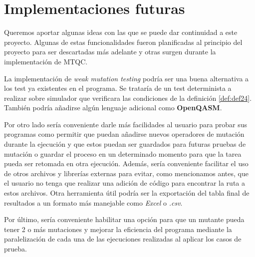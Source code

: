 \section{Implementaciones futuras}

Queremos aportar algunas ideas con las que se puede dar continuidad a este proyecto. Algunas de estas funcionalidades fueron planificadas al principio del proyecto para ser descartadas más adelante y otras surgen durante la implementación de MTQC.

La implementación de \textit{weak mutation testing} podría ser una buena alternativa a los test ya existentes en el programa. Se trataría de un test determinista a realizar sobre simulador que verificara las condiciones de la definición \ref{def:def24}. También podría añadirse algún lenguaje adicional como \textbf{OpenQASM}.

Por otro lado sería conveniente darle más facilidades al usuario para probar sus programas como permitir que puedan añadirse nuevos operadores de mutación durante la ejecución y que estos puedan ser guardados para futuras pruebas de mutación o guardar el proceso en un determinado momento para que la tarea pueda ser retomada en otra ejecución. Además, sería conveniente facilitar el uso de otros archivos y librerías externas para evitar, como mencionamos antes, que el usuario no tenga que realizar una adición de código para encontrar la ruta a estos archivos. Otra herramienta útil podría ser la exportación del tabla final de resultados a un formato más manejable como \textit{Excel} o \textit{.csv}.

Por último, sería conveniente habilitar una opción para que un mutante pueda tener 2 o más mutaciones y mejorar la eficiencia del programa mediante la paralelización de cada una de las ejecuciones realizadas al aplicar los casos de prueba.


